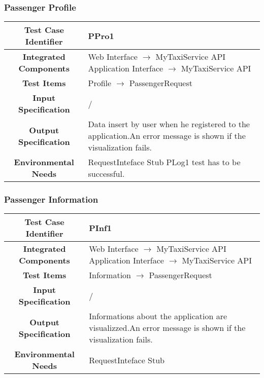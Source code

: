 \documentclass[11pt, a4paper,titlepage]{article}
\begin{document}
	\subsubsection{Passenger Profile }
	\begin{tabularx}{\textwidth}{| c|X|}
		\hline \textbf{Test Case Identifier} & \label{PPro1}PPro1 \\
		\hline \textbf{Integrated Components} &  Web Interface $\rightarrow $ MyTaxiService API \newline 
		Application Interface $\rightarrow $ MyTaxiService API \\ 
		\hline \textbf{Test Items} & Profile $\rightarrow $ PassengerRequest \\
		\hline \textbf{Input Specification} & / \\
		\hline \textbf{Output Specification} & Data insert by user when he registered to the application.\newline 	An error message is shown if the visualization fails. \\
		\hline \textbf{Environmental Needs} & RequestInteface Stub \newline PLog1 test has to be successful. \\
		\hline
	\end{tabularx}
	\newline
	\newline
	\subsubsection{Passenger Information }
	\begin{tabularx}{\textwidth}{| c|X|}
		\hline \textbf{Test Case Identifier} & \label{PInf1}PInf1 \\
		\hline \textbf{Integrated Components} &  Web Interface $\rightarrow $ MyTaxiService API \newline 
		Application Interface $\rightarrow $ MyTaxiService API \\
		\hline \textbf{Test Items} & Information $\rightarrow $ PassengerRequest \\
		\hline \textbf{Input Specification} & / \\
		\hline \textbf{Output Specification} & Informations about the application are visualizzed.\newline An error message is shown if the visualization fails. \\
		\hline \textbf{Environmental Needs} & RequestInteface Stub \\
		\hline
	\end{tabularx}
	\newline
	\newline
\end{document}
